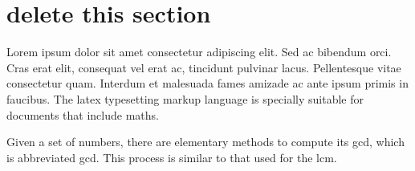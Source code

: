 \documentclass[11pt, a4paper]{report}
\begin{document}
\tableofcontents
\clearpage	
	
\listoffigures
\clearpage

\listoftables
\clearpage

\printglossary[type=\acronymtype]
\clearpage

\printnomenclature
\clearpage



\linenumbers %





\clearpage
\section*{delete this section}
\par Lorem ipsum dolor sit amet consectetur adipiscing elit. Sed ac bibendum orci. Cras \cite{Popper1934} erat elit, consequat vel erat ac, tincidunt pulvinar lacus. Pellentesque vitae consectetur quam. Interdum et malesuada fames \gls{amizade} ac ante ipsum primis in faucibus. 
The \Gls{latex} typesetting markup language is specially suitable 
for documents that include \gls{maths}. 

Given a set of numbers, there are elementary methods to compute 
its \acrlong{gcd}, which is abbreviated \acrshort{gcd}. This 
process is similar to that used for the \acrfull{lcm}.

\clearpage

\printglossary[title=Glossário, toctitle=Glossário]

\clearpage
\printbibliography
\end{document}
